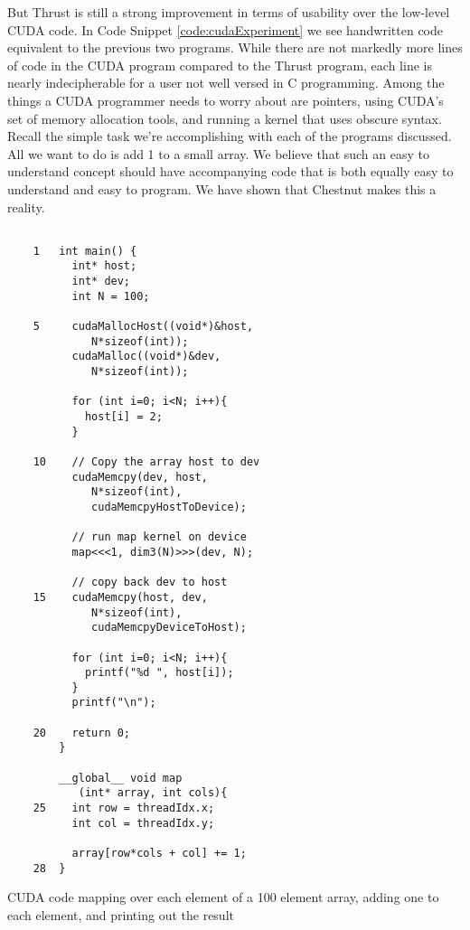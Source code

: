 \documentclass[twocolumn]{article}
\renewcommand{\|}{\origbar} %
\begin{document}
But Thrust is still a strong improvement in terms of usability over the low-level CUDA code. In Code Snippet \ref{code:cudaExperiment} we see handwritten code equivalent to the previous two programs. While there are not markedly more lines of code in the CUDA program compared to the Thrust program, each line is nearly indecipherable for a user not well versed in C programming. Among the things a CUDA programmer needs to worry about are pointers, using CUDA's set of memory allocation tools, and running a kernel that uses obscure syntax. Recall the simple task we're accomplishing with each of the programs discussed. All we want to do is add 1 to a small array. We believe that such an easy to understand concept should have accompanying code that is both equally easy to understand and easy to program. We have shown that Chestnut makes this a reality.

\begin{Code Snippet}
\begin{verbatim}
 
    1   int main() {
          int* host;
          int* dev;
          int N = 100;
     
    5     cudaMallocHost((void*)&host, 
             N*sizeof(int));
          cudaMalloc((void*)&dev, 
             N*sizeof(int));
      
          for (int i=0; i<N; i++){
            host[i] = 2;
          }
 
    10    // Copy the array host to dev
          cudaMemcpy(dev, host, 
             N*sizeof(int),
             cudaMemcpyHostToDevice);
 
          // run map kernel on device
          map<<<1, dim3(N)>>>(dev, N);
 
          // copy back dev to host
    15    cudaMemcpy(host, dev, 
             N*sizeof(int),
             cudaMemcpyDeviceToHost);
      
          for (int i=0; i<N; i++){
            printf("%d ", host[i]);
          }
          printf("\n");
      
    20    return 0;
        }
 
        __global__ void map
           (int* array, int cols){
    25    int row = threadIdx.x;
          int col = threadIdx.y;
       
          array[row*cols + col] += 1;
    28  }                                    
\end{verbatim}
\caption{CUDA code mapping over each element of a 100 element array, adding one to each element, and printing out the result}
\label{code:cudaExperiment}
\end{Code Snippet}
\end{document}
